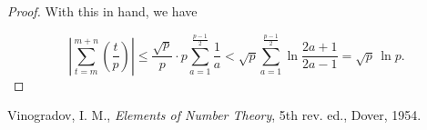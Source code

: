 \documentclass[12pt]{article}
\theoremstyle{definition}
\begin{document}
\begin{proof}
With this in hand, we have

$$
\left|\sum_{t=m}^{m+n} \left(\frac{t}{p}\right)\right| \leq
\frac{\sqrt{p}}{p} \cdot p \sum_{a=1}^{\frac{p-1}{2}} \frac{1}{a} < 
\sqrt{p} \sum_{a=1}^{\frac{p-1}{2}} \ln \frac{2a+1}{2a-1} = 
\sqrt{p} \, \ln p.
$$
\end{proof}
\begin{thebibliography}{9}
 Vinogradov, I. M., {\em Elements of Number Theory}, 5th rev. ed., Dover, 1954.
\end{thebibliography}
\end{document}
